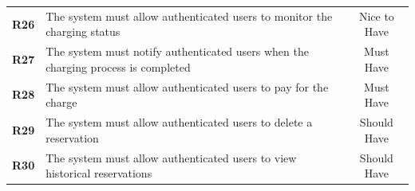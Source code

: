 \begin{table}[H]
\begin{tabularx}{\textwidth}{cXc}
        \textbf{R26} & The system must allow authenticated users to monitor the charging status                                          & Nice to Have   \\
        \textbf{R27} & The system must notify authenticated users when the charging process is completed                                 & Must Have      \\
        \textbf{R28} & The system must allow authenticated users to pay for the charge                                                   & Must Have      \\
        \textbf{R29} & The system must allow authenticated users to delete a reservation                                                 & Should Have    \\
        \textbf{R30} & The system must allow authenticated users to view historical reservations                                         & Should Have    \\
        \bottomrule
    \end{tabularx}
\end{table}

